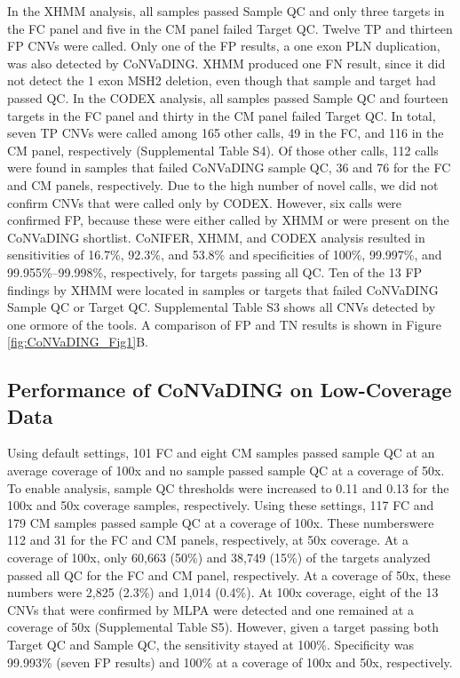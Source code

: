 In the XHMM analysis, all samples passed Sample QC and only three targets in the FC panel and five in the CM panel failed Target QC. 
Twelve TP and thirteen FP CNVs were called. 
Only one of the FP results, a one exon PLN duplication, was also detected by CoNVaDING. 
XHMM produced one FN result, since it did not detect the 1 exon MSH2 deletion, even though that sample and target had passed QC. 
In the CODEX analysis, all samples passed Sample QC and fourteen targets in the FC panel and thirty in the CM panel failed Target QC. 
In total, seven TP CNVs were called among 165 other calls, 49 in the FC, and 116 in the CM panel, respectively (Supplemental Table S4). 
Of those other calls, 112 calls were found in samples that failed CoNVaDING sample QC, 36 and 76 for the FC and CM panels, respectively. 
Due to the high number of novel calls, we did not confirm CNVs that were called only by CODEX. 
However, six calls were confirmed FP, because these were either called by XHMM or were present on the CoNVaDING shortlist. 
CoNIFER, XHMM, and CODEX analysis resulted in sensitivities of 16.7\%, 92.3\%, and 53.8\% and specificities of 100\%, 99.997\%, and 99.955\%–99.998\%, respectively, for targets passing all QC. 
Ten of the 13 FP findings by XHMM were located in samples or targets that failed CoNVaDING Sample QC or Target QC. 
Supplemental Table S3 shows all CNVs detected by one ormore of the tools. 
A comparison of FP and TN results is shown in Figure  \ref{fig:CoNVaDING_Fig1}B.



\subsection{Performance of CoNVaDING on Low-Coverage Data}
Using default settings, 101 FC and eight CM samples passed
sample QC at an average coverage of 100x and no sample passed sample QC at a coverage of 50x. 
To enable analysis, sample QC thresholds were increased to 0.11 and 0.13 for the 100x and 50x coverage samples, respectively. Using these settings, 117 FC and 179 CM samples passed sample QC at a coverage of 100x. 
These numberswere 112 and 31 for the FC and CM panels, respectively, at 50x coverage. 
At a coverage of 100x, only 60,663 (50\%) and 38,749 (15\%) of the targets analyzed passed all QC for the FC and CM panel, respectively. 
At a coverage of 50x, these numbers were 2,825 (2.3\%) and 1,014 (0.4\%). 
At 100x coverage, eight of the 13 CNVs that were confirmed by MLPA were detected and one remained at a coverage of 50x (Supplemental Table S5).
However, given a target passing both Target QC and Sample QC, the sensitivity stayed at 100\%. Specificity was 99.993\% (seven FP results) and 100\% at a coverage of 100x and 50x, respectively.


